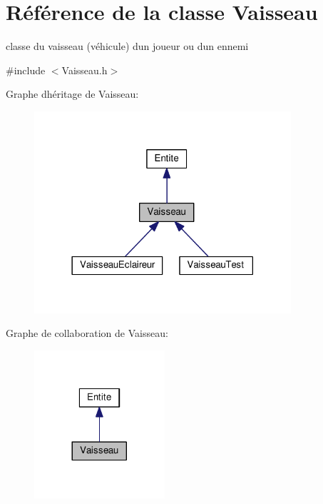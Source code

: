 \hypertarget{class_vaisseau}{}\section{Référence de la classe Vaisseau}
\label{class_vaisseau}


classe du vaisseau (véhicule) d\textquotesingle{}un joueur ou d\textquotesingle{}un ennemi  




{\ttfamily \#include $<$Vaisseau.\+h$>$}



Graphe d\textquotesingle{}héritage de Vaisseau\+:\nopagebreak
\begin{figure}[H]
\begin{center}
\leavevmode
\includegraphics[width=270pt]{class_vaisseau__inherit__graph}
\end{center}
\end{figure}


Graphe de collaboration de Vaisseau\+:\nopagebreak
\begin{figure}[H]
\begin{center}
\leavevmode
\includegraphics[width=137pt]{class_vaisseau__coll__graph}
\end{center}
\end{figure}
